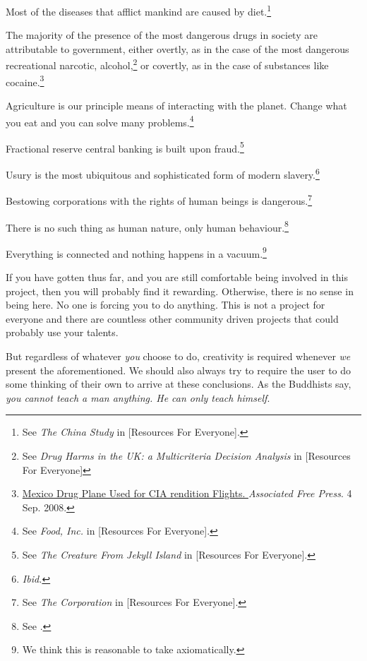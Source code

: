 \item
Most of the diseases that afflict mankind are caused by diet.\footnote{See {\it The China Study} in [Resources For Everyone].}

\item
The majority of the presence of the most dangerous drugs in society are attributable to government, either overtly, as in the case of the most dangerous recreational narcotic, alcohol,\footnote{See {\it Drug Harms in the UK: a Multicriteria Decision Analysis} in [Resources For Everyone]} or covertly, as in the case of substances like cocaine.\footnote{\href{http://afp.google.com/article/ALeqM5j6QonBKKMo2gw1e3ql-xUcQEZbVg}{Mexico Drug Plane Used for CIA rendition Flights. }{\it Associated Free Press}. 4 Sep. 2008.}

\item
Agriculture is our principle means of interacting with the planet. Change what you eat and you can solve many problems.\footnote{See {\it Food, Inc.} in [Resources For Everyone].}

\item
Fractional reserve central banking is built upon fraud.\footnote{See {\it The Creature From Jekyll Island} in [Resources For Everyone].}

\item
Usury is the most ubiquitous and sophisticated form of modern slavery.\footnote{{\it Ibid.}}

\item
Bestowing corporations with the rights of human beings is dangerous.\footnote{See {\it The Corporation} in [Resources For Everyone].}

\item
There is no such thing as human nature, only human behaviour.\footnote{See .}

\item
Everything is connected and nothing happens in a vacuum.\footnote{We think this is reasonable to take axiomatically.}
\stopitemize

If you have gotten thus far, and you are still comfortable being involved in this project, then you will probably find it rewarding. Otherwise, there is no sense in being here. No one is forcing you to do anything. This is not a project for everyone and there are countless other community driven projects that could probably use your talents.

But regardless of whatever {\it you} choose to do, creativity is required whenever {\it we} present the aforementioned. We should also always try to require the user to do some thinking of their own to arrive at these conclusions. As the Buddhists say, {\it you cannot teach a man anything. He can only teach himself}.

